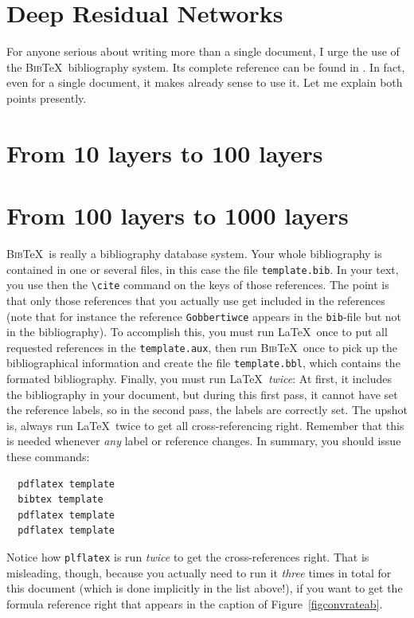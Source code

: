 \documentclass[12pt]{article}
\numberwithin{equation}{section}
\numberwithin{table}{section}
\numberwithin{figure}{section}
\begin{document}
\section{Deep Residual Networks} \label{secreferences}

For anyone serious about writing more than a single document, I urge
the use of the \textsc{Bib}\TeX\ bibliography system. Its complete
reference can be found in \cite[Appendix B]{Lamport94}.
In fact, even for a single document, it makes already sense to use it.
Let me explain both points presently.


\section{From 10 layers to 100 layers} \label{r1}

\section{From 100 layers to 1000 layers} \label{r2}

\textsc{Bib}\TeX\ is really a bibliography database system. Your whole
bibliography is contained in one or several files, in this case the file
\verb+template.bib+. In your text, you use then the \verb+\cite+ command
on the keys of those references. The point is that only those references
that you actually use get included in the references (note that for
instance the reference \verb+Gobbertiwce+ appears in the \verb+bib+-file
but not in the bibliography). To accomplish this,
you must run \LaTeX\ once to put all requested references in the
\verb+template.aux+, then run \textsc{Bib}\TeX\ once to pick up the
bibliographical information and create the file \verb+template.bbl+,
which contains the formated bibliography. Finally, you must run \LaTeX\
\emph{twice}: At first, it includes the bibliography in your document,
but during this first pass, it cannot have set the reference labels,
so in the second pass, the labels are correctly set. The upshot is,
always run \LaTeX\ twice to get all cross-referencing right. Remember
that this is needed whenever \emph{any} label or reference changes.
In summary, you should issue these commands:
\begin{verbatim}
  pdflatex template
  bibtex template
  pdflatex template
  pdflatex template
\end{verbatim}
Notice how \verb+plflatex+ is run \emph{twice} to get the cross-references
right. That is misleading, though, because you actually need to run
it \emph{three} times in total for this document
(which is done implicitly in the list above!),
if you want to get the formula reference right that appears in the caption
of Figure~\ref{figconvrateab}.
\end{document}
